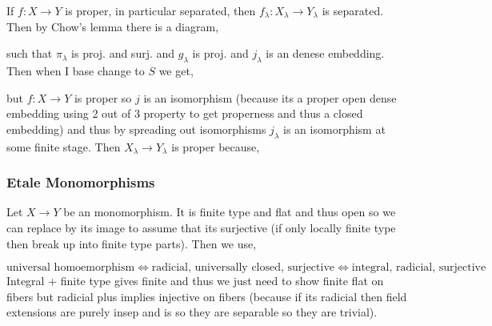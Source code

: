 \documentclass[12pt]{article}
\begin{document}
If $f : X \to Y$ is proper, in particular separated, then $f_\lambda : X_\lambda \to Y_\lambda$ is separated. Then by Chow's lemma there is a diagram,
\begin{center}
\end{center}
such that $\pi_\lambda$ is proj. and surj. and $g_\lambda$ is proj. and $j_\lambda$ is an denese embedding. Then when I base change to $S$ we get,
\begin{center}
\end{center}
but $f : X \to Y$ is proper so $j$ is an isomorphism (because its a proper open dense embedding using 2 out of 3 property to get properness and thus a closed embedding) and thus by spreading out isomorphisms $j_\lambda$ is an isomorphism at some finite stage. Then $X_\lambda \to Y_\lambda$ is proper because,
\begin{center}
\begin{tikzcd}

\end{tikzcd}
\end{center}

\subsubsection{Etale Monomorphisms}

Let $X \to Y$ be an \etale monomorphism. It is finite type and flat and thus open so we can replace by its image to assume that its surjective (if only locally finite type then break up into finite type parts). Then we use,

\[ \text{universal homoemorphism} \iff \text{radicial, universally closed, surjective} \iff \text{integral, radicial, surjective} \]
Integral + finite type gives finite and thus we just need to show finite flat on fibers but radicial plus \etale implies injective on fibers (because if its radicial then field extensions are purely insep and is \etale so they are separable so they are trivial).    
\end{document}
